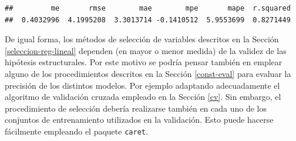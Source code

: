 \documentclass[
]{book}
\newenvironment{Shaded}{\begin{snugshade}}{\end{snugshade}}
\newcommand{\CommentTok}[1]{\textcolor[rgb]{0.56,0.35,0.01}{\textit{#1}}}
\newcommand{\ControlFlowTok}[1]{\textcolor[rgb]{0.13,0.29,0.53}{\textbf{#1}}}
\newcommand{\DataTypeTok}[1]{\textcolor[rgb]{0.13,0.29,0.53}{#1}}
\newcommand{\DecValTok}[1]{\textcolor[rgb]{0.00,0.00,0.81}{#1}}
\newcommand{\KeywordTok}[1]{\textcolor[rgb]{0.13,0.29,0.53}{\textbf{#1}}}
\newcommand{\NormalTok}[1]{#1}
\newcommand{\OperatorTok}[1]{\textcolor[rgb]{0.81,0.36,0.00}{\textbf{#1}}}
\newcommand{\OtherTok}[1]{\textcolor[rgb]{0.56,0.35,0.01}{#1}}
\newcommand{\StringTok}[1]{\textcolor[rgb]{0.31,0.60,0.02}{#1}}
\theoremstyle{break}
\theoremstyle{definition}
\theoremstyle{definition}
\theoremstyle{definition}
\theoremstyle{remark}
\begin{document}
\begin{Shaded}
\end{Shaded}

\begin{verbatim}
##         me       rmse        mae        mpe       mape  r.squared 
##  0.4032996  4.1995208  3.3013714 -0.1410512  5.9553699  0.8271449
\end{verbatim}

De igual forma, los métodos de selección de variables descritos en la Sección \ref{seleccion-reg-lineal} dependen (en mayor o menor medida) de la validez de las hipótesis estructurales.
Por este motivo se podría pensar también en emplear alguno de los procedimientos descritos en la Sección \ref{const-eval} para evaluar la precisión de los distintos modelos.
Por ejemplo adaptando adecuadamente el algoritmo de validación cruzada empleado en la Sección \ref{cv}.
Sin embargo, el procedimiento de selección debería realizarse también en cada uno de los conjuntos de entrenamiento utilizados en la validación.
Esto puede hacerse fácilmente empleando el paquete \texttt{caret}.
\end{document}
